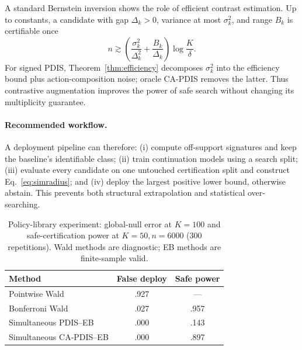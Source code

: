 A standard Bernstein inversion shows the role of efficient contrast estimation. Up to constants, a candidate with gap $\Delta_k>0$, variance at most $\sigma_k^2$, and range $B_k$ is certifiable once
\begin{equation}
 n\gtrsim
 \left(\frac{\sigma_k^2}{\Delta_k^2}+\frac{B_k}{\Delta_k}\right)
 \log\frac{K}{\delta}.
\label{eq:librarycomplexity}
\end{equation}
For signed PDIS, Theorem~\ref{thm:efficiency} decomposes $\sigma_k^2$ into the efficiency bound plus action-composition noise; oracle CA-PDIS removes the latter. Thus contrastive augmentation improves the power of safe search without changing its multiplicity guarantee.

\paragraph{Recommended workflow.}
A deployment pipeline can therefore: (i) compute off-support signatures and keep the baseline's identifiable class; (ii) train continuation models using a search split; (iii) evaluate every candidate on one untouched certification split and construct Eq.~\eqref{eq:simradius}; and (iv) deploy the largest positive lower bound, otherwise abstain. This prevents both structural extrapolation and statistical over-searching.

\begin{table}[t]
\centering
\footnotesize
\setlength{\tabcolsep}{3.2pt}
\begin{tabular}{@{}lcc@{}}
\toprule
Method & False deploy & Safe power \\
\midrule
Pointwise Wald & .927 & --- \\
Bonferroni Wald & .027 & .957 \\
Simultaneous PDIS--EB & .000 & .143 \\
Simultaneous CA-PDIS--EB & .000 & .897 \\
\bottomrule
\end{tabular}
\caption{Policy-library experiment: global-null error at $K=100$ and safe-certification power at $K=50,n=6000$ (300 repetitions). Wald methods are diagnostic; EB methods are finite-sample valid.}
\label{tab:librarymain}
\end{table}
